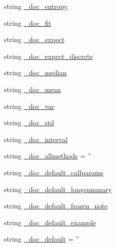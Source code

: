 \begin{DoxyCompactItemize}
\item 
string \hyperlink{namespacescipy_1_1stats_1_1__distn__infrastructure_a3eeec5d5b5e81e82f47b9c3f9744e38b}{\+\_\+doc\+\_\+entropy}
\item 
string \hyperlink{namespacescipy_1_1stats_1_1__distn__infrastructure_abb4a64b225d08db962f6b5c17ff353a7}{\+\_\+doc\+\_\+fit}
\item 
string \hyperlink{namespacescipy_1_1stats_1_1__distn__infrastructure_adde0926e3aa3ebfa30b3101106a3edef}{\+\_\+doc\+\_\+expect}
\item 
string \hyperlink{namespacescipy_1_1stats_1_1__distn__infrastructure_a36226ddc7b1c4eecae5945a75f1ee528}{\+\_\+doc\+\_\+expect\+\_\+discrete}
\item 
string \hyperlink{namespacescipy_1_1stats_1_1__distn__infrastructure_af3f8025cb195f3f981da0a46bd8ccc47}{\+\_\+doc\+\_\+median}
\item 
string \hyperlink{namespacescipy_1_1stats_1_1__distn__infrastructure_ad6731cf3028967a7687eb4db4cc7bdaa}{\+\_\+doc\+\_\+mean}
\item 
string \hyperlink{namespacescipy_1_1stats_1_1__distn__infrastructure_a480f5bcdc589f8a8fd497e2cd3b3c33c}{\+\_\+doc\+\_\+var}
\item 
string \hyperlink{namespacescipy_1_1stats_1_1__distn__infrastructure_a91a209efd69375f697ce052e17ca88df}{\+\_\+doc\+\_\+std}
\item 
string \hyperlink{namespacescipy_1_1stats_1_1__distn__infrastructure_a5757a35a37fc3ae45daa3008790f9169}{\+\_\+doc\+\_\+interval}
\item 
string \hyperlink{namespacescipy_1_1stats_1_1__distn__infrastructure_ad0316053d41837f11c1eb80e50614aa7}{\+\_\+doc\+\_\+allmethods} = ''
\item 
string \hyperlink{namespacescipy_1_1stats_1_1__distn__infrastructure_a1cf172e67063c9cc5148f1be46201bf0}{\+\_\+doc\+\_\+default\+\_\+callparams}
\item 
string \hyperlink{namespacescipy_1_1stats_1_1__distn__infrastructure_ade4baad7aed141a2d246360582e338bf}{\+\_\+doc\+\_\+default\+\_\+longsummary}
\item 
string \hyperlink{namespacescipy_1_1stats_1_1__distn__infrastructure_a27784a962358819bc3bca2d1b273b921}{\+\_\+doc\+\_\+default\+\_\+frozen\+\_\+note}
\item 
string \hyperlink{namespacescipy_1_1stats_1_1__distn__infrastructure_a7684a9b4d92057b90a2d146769bb58e6}{\+\_\+doc\+\_\+default\+\_\+example}
\item 
string \hyperlink{namespacescipy_1_1stats_1_1__distn__infrastructure_aedba530f1a1414266fbf55a412db753a}{\+\_\+doc\+\_\+default} = ''

\end{DoxyCompactItemize}
